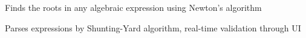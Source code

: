 \documentclass[]{deedy-resume-openfont}
\begin{document}
\begin{minipage}[t]{0.66\textwidth}



\begin{tightemize}
\item Finds the roots in any algebraic expression using Newton's algorithm\\ %
\item Parses expressions by Shunting-Yard algorithm, real-time validation through UI\\
\end{tightemize}
\sectionsep




\end{minipage}
\end{document}
